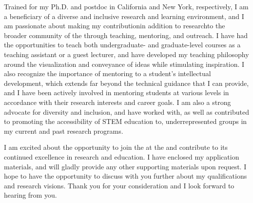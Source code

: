 

Trained for my Ph.D. and postdoc in California and New York, respectively, I am a beneficiary of a diverse and inclusive research and learning environment, and I am passionate about making my contribution\textemdash in addition to research\textemdash to the broader community of the \appSchool{} through teaching, mentoring, and outreach. I have had the opportunities to teach both undergraduate- and graduate-level courses as a teaching assistant or a guest lecturer, and have developed my teaching philosophy around the visualization and conveyance of ideas while stimulating inspiration. I also recognize the importance of mentoring to a student's intellectual development, which extends far beyond the technical guidance that I can provide, and I have been actively involved in mentoring students at various levels in accordance with their research interests and career goals. I am also a strong advocate for diversity and inclusion, and have worked with, as well as contributed to promoting the accessibility of STEM education to, underrepresented groups in my current and past research programs.

I am excited about the opportunity to join the \appDept{} at the \appSchool{} and contribute to its continued excellence in research and education. I have enclosed my application materials, and will gladly provide any other supporting materials upon request. I hope to have the opportunity to discuss with you further about my qualifications and research visions. Thank you for your consideration and I look forward to hearing from you.


